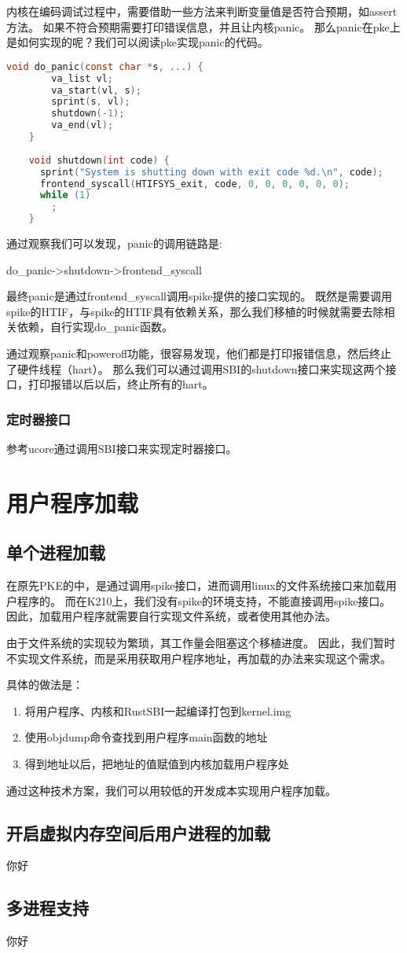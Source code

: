内核在编码调试过程中，需要借助一些方法来判断变量值是否符合预期，如assert方法。
如果不符合预期需要打印错误信息，并且让内核panic。
那么panic在pke上是如何实现的呢？我们可以阅读pke实现panic的代码。

\begin{lstlisting}[language=C, caption={panic实现代码}, label={lst:panic} ]
    void do_panic(const char *s, ...) {
        va_list vl;
        va_start(vl, s);
        sprint(s, vl);
        shutdown(-1);
        va_end(vl);
    }
    
    void shutdown(int code) {
      sprint("System is shutting down with exit code %d.\n", code);
      frontend_syscall(HTIFSYS_exit, code, 0, 0, 0, 0, 0, 0);
      while (1)
        ;
    }    
\end{lstlisting}

通过观察我们可以发现，panic的调用链路是:

do\_panic->shutdown->frontend\_syscall

最终panic是通过frontend\_syscall调用spike提供的接口实现的。
既然是需要调用spike的HTIF，与spike的HTIF具有依赖关系，那么我们移植的时候就需要去除相关依赖，自行实现do\_panic函数。

通过观察panic和poweroff功能，很容易发现，他们都是打印报错信息，然后终止了硬件线程（hart）。
那么我们可以通过调用SBI的shutdown接口来实现这两个接口，打印报错以后以后，终止所有的hart。

\subsubsection{定时器接口}

参考ucore通过调用SBI接口来实现定时器接口。

\section{用户程序加载}

\subsection{单个进程加载}

在原先PKE的中，是通过调用spike接口，进而调用linux的文件系统接口来加载用户程序的。
而在K210上，我们没有spike的环境支持，不能直接调用spike接口。
因此，加载用户程序就需要自行实现文件系统，或者使用其他办法。

由于文件系统的实现较为繁琐，其工作量会阻塞这个移植进度。
因此，我们暂时不实现文件系统，而是采用获取用户程序地址，再加载的办法来实现这个需求。

具体的做法是：

\begin{enumerate}
    \item 将用户程序、内核和RustSBI一起编译打包到kernel.img
    \item 使用objdump命令查找到用户程序main函数的地址
    \item 得到地址以后，把地址的值赋值到内核加载用户程序处
\end{enumerate}

通过这种技术方案，我们可以用较低的开发成本实现用户程序加载。

\subsection{开启虚拟内存空间后用户进程的加载}
你好

\subsection{多进程支持}
你好